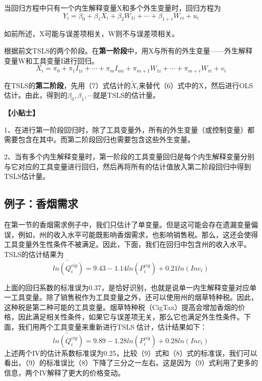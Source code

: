 \documentclass[cn,12pt,math=newtx,citestyle=gb7714-2015,bibstyle=gb7714-2015]{elegantbook}
\begin{document}
	当回归方程中只有一个内生解释变量X和多个外生变量时，回归方程为
	\begin{equation}
		Y_i=\beta_0+\beta_1X_i+\beta_2W_{1i}+\cdots+\beta_{1+r}W_{ri}+u_i
	\end{equation}
	
	如前所述，X可能与误差项相关，W则不与误差项相关。
	
	根据前文TSLS的两个阶段。在\textbf{第一阶段}中，用X与所有的外生变量——外生解释变量W和工具变量I进行回归。
	\begin{equation}
		X_i=\pi_0+\pi_1I_{1i}+\cdots+\pi_mI_{mi}+\pi_{m+1}W_{1i}+\cdots+\pi_{m+r}W_{ri}+v_i
	\end{equation}
	
	在TSLS的\textbf{第二阶段}，先用（7）式估计的$\tilde{X}_i$来替代（6）式中的X，然后进行OLS估计。由此，得到的$\beta_0,\beta_1,\cdots$就是TSLS的估计量。
	
	\textbf{【小贴士】}
	
	1、在进行第一阶段回归时，除了工具变量外，所有的外生变量（或控制变量）都需要包含在其中。而第二阶段回归也需要包含这些外生变量。
	
	2、当有多个内生解释变量时，第一阶段的工具变量回归是每个内生解释变量分别与它对应的工具变量进行回归，然后再将所有的估计值放入第二阶段回归中得到TSLS估计量。
	
	\subsection{例子：香烟需求}
	
	在第一节的香烟需求例子中，我们只估计了单变量。但是这可能会存在遗漏变量偏误，例如，州的收入水平可能既影响香烟需求，也影响销售税。那么，这还会使得工具变量外生性条件不被满足。因此，下面，我们在回归中包含州的收入水平。TSLS的估计结果为
	\begin{equation}
		\tilde{ln(Q_i^{cig})}=9.43-1.14ln(P_i^{cig})+0.21ln(Inc_i)
	\end{equation}
	
	上面的回归系数的标准误为0.37，是恰好识别，也就是说单一内生解释变量对应单一工具变量。除了销售税作为工具变量之外，还可以使用州的烟草特种税。因此，这种税是第二种可能的工具变量。烟草特种税（CigTax）提高会增加香烟的价格，因此满足相关性条件，如果它与误差项无关，那么它也满足外生性条件。下面，我们用两个工具变量来重新进行TSLS 估计，估计结果如下：
	\begin{equation}
		\tilde{ln(Q_i^{cig})}=9.89-1.28ln(P_i^{cig})+0.28ln(Inc_i)
	\end{equation}
	上述两个IV的估计系数标准误为0.25，比较（9）式和（8）式的标准误，我们可以看出，（9）的标准误比（8）下降了三分之一左右。这是因为（9）式利用了更多的信息，两个IV解释了更大的价格变动。
	
\end{document}
